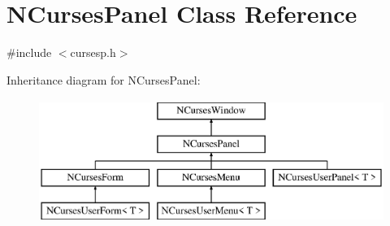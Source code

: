 \hypertarget{class_n_curses_panel}{\section{N\-Curses\-Panel Class Reference}
\label{class_n_curses_panel}
}


{\ttfamily \#include $<$cursesp.\-h$>$}

Inheritance diagram for N\-Curses\-Panel\-:\begin{figure}[H]
\begin{center}
\leavevmode
\includegraphics[height=4.000000cm]{class_n_curses_panel}
\end{center}
\end{figure}
